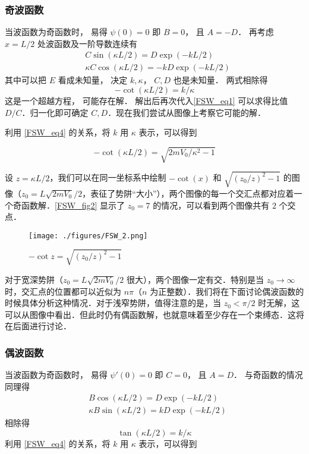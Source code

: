 \subsubsection{奇波函数}
当波函数为奇函数时， 易得 $\psi(0) = 0$ 即 $B = 0$， 且 $A = -D$． 再考虑 $x = L/2$ 处波函数及一阶导数连续有
\begin{equation}\label{FSW_eq1}
\begin{aligned}
&C\sin(\kappa L/2) = D \exp(-kL/2)\\
&\kappa C \cos(\kappa L/2) = -kD \exp(-kL/2)
\end{aligned}
\end{equation}
其中可以把 $E$ 看成未知量， 决定 $k, \kappa$， $C,D$ 也是未知量． 两式相除得
\begin{equation}\label{FSW_eq2}
-\cot(\kappa L/2) = k/\kappa
\end{equation}
这是一个超越方程， 可能存在解． 解出后再次代入\autoref{FSW_eq1} 可以求得比值 $D/C$．归一化即可确定 $C, D$．现在我们尝试从图像上考察它可能的解．

利用 \autoref{FSW_eq4} 的关系，将 $k$ 用 $\kappa$ 表示，可以得到

\begin{equation}
-\cot(\kappa L/2)=\sqrt{2mV_0/\kappa^2-1}
\end{equation}

设 $z=\kappa L/2$，我们可以在同一坐标系中绘制 $-\cot(x)$ 和 $\sqrt{(z_0/z)^2-1}$ 的图像（$z_0=L\sqrt{2mV_0}/2$，表征了势阱“大小”），两个图像的每一个交汇点都对应着一个奇函数解．\autoref{FSW_fig2} 显示了 $z_0=7$ 的情况，可以看到两个图像共有 $2$ 个交点．

\begin{figure}[ht]
\centering
\texttt{[image: ./figures/FSW\_2.png]}
\caption{$-\cot z=\sqrt{(z_0/z)^2-1}$} \label{FSW_fig2}
\end{figure}

对于宽深势阱（$z_0=L\sqrt{2mV_0}/2$ 很大），两个图像一定有交．特别是当 $z_0\rightarrow\infty$ 时，交汇点的位置都可以近似为 $n\pi$（$n$ 为正整数）．我们将在下面讨论偶波函数的时候具体分析这种情况．对于浅窄势阱，值得注意的是，当 $z_0<\pi/2$ 时无解，这可以从图像中看出．但此时仍有偶函数解，也就意味着至少存在一个束缚态．这将在后面进行讨论．

\subsubsection{偶波函数}
当波函数为奇函数时， 易得 $\psi'(0) = 0$ 即 $C = 0$， 且 $A = D$． 与奇函数的情况同理得
\begin{equation}
\begin{aligned}
&B\cos(\kappa L/2) = D \exp(-kL/2)\\
&\kappa B \sin(\kappa L/2) = kD \exp(-kL/2)
\end{aligned}
\end{equation}
相除得
\begin{equation}\label{FSW_eq3}
\tan(\kappa L/2) = k/\kappa
\end{equation}
利用 \autoref{FSW_eq4} 的关系，将 $k$ 用 $\kappa$ 表示，可以得到

